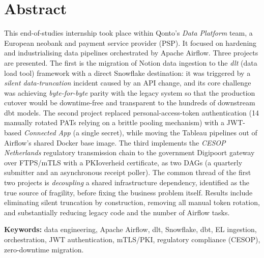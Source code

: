 \chapter*{Abstract}

This end-of-studies internship took place within Qonto's \emph{Data Platform} team, a European neobank and payment service provider (PSP). It focused on hardening and industrialising data pipelines orchestrated by Apache Airflow. Three projects are presented. The first is the migration of Notion data ingestion to the \emph{dlt} (data load tool) framework with a direct Snowflake destination: it was triggered by a \emph{silent data-truncation} incident caused by an API change, and its core challenge was achieving \emph{byte-for-byte} parity with the legacy system so that the production cutover would be downtime-free and transparent to the hundreds of downstream dbt models. The second project replaced personal-access-token authentication (14 manually rotated PATs relying on a brittle pooling mechanism) with a JWT-based \emph{Connected App} (a single secret), while moving the Tableau pipelines out of Airflow's shared Docker base image. The third implements the \emph{CESOP Netherlands} regulatory transmission chain to the government Digipoort gateway over FTPS/mTLS with a PKIoverheid certificate, as two DAGs (a quarterly submitter and an asynchronous receipt poller). The common thread of the first two projects is \emph{decoupling} a shared infrastructure dependency, identified as the true source of fragility, before fixing the business problem itself. Results include eliminating silent truncation by construction, removing all manual token rotation, and substantially reducing legacy code and the number of Airflow tasks.

\vspace{4pt}
\noindent\textbf{Keywords:} data engineering, Apache Airflow, dlt, Snowflake, dbt, EL ingestion, orchestration, JWT authentication, mTLS/PKI, regulatory compliance (CESOP), zero-downtime migration.

